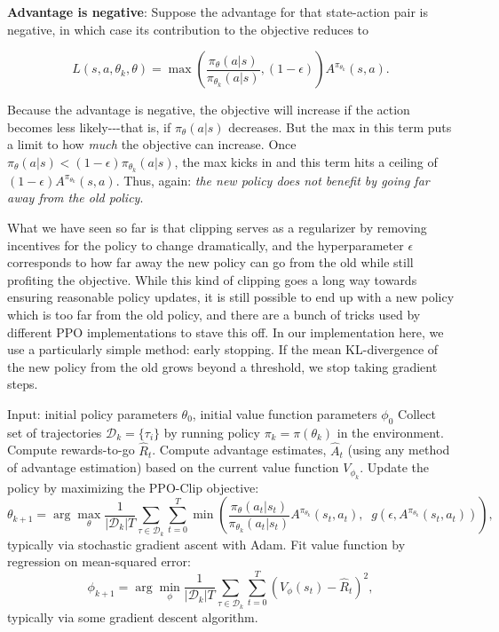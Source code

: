 \documentclass[12pt,a4paper]{article}
\begin{document}
\textbf{Advantage is negative}: Suppose the advantage for that
state-action pair is negative, in which case its contribution to the
objective reduces to

\[L(s,a,\theta_k,\theta) = \max\left(
\frac{\pi_{\theta}(a|s)}{\pi_{\theta_k}(a|s)}, (1 - \epsilon)
\right)  A^{\pi_{\theta_k}}(s,a).\]

Because the advantage is negative, the objective will increase if the
action becomes less likely-\/-\/-that is, if \(\pi_{\theta}(a|s)\)
decreases. But the max in this term puts a limit to how \emph{much} the
objective can increase. Once
\(\pi_{\theta}(a|s) < (1-\epsilon) \pi_{\theta_k}(a|s)\), the max kicks
in and this term hits a ceiling of
\((1-\epsilon) A^{\pi_{\theta_k}}(s,a)\). Thus, again: \emph{the new
policy does not benefit by going far away from the old policy}.

What we have seen so far is that clipping serves as a regularizer by
removing incentives for the policy to change dramatically, and the
hyperparameter \(\epsilon\) corresponds to how far away the new policy
can go from the old while still profiting the objective. While this kind of clipping goes a long way towards ensuring reasonable
policy updates, it is still possible to end up with a new policy which
is too far from the old policy, and there are a bunch of tricks used by
different PPO implementations to stave this off. In our implementation
here, we use a particularly simple method: early stopping. If the mean
KL-divergence of the new policy from the old grows beyond a threshold,
we stop taking gradient steps.

\begin{algorithmic}[1]
    \STATE Input: initial policy parameters $\theta_0$, initial value function parameters $\phi_0$
    \STATE Collect set of trajectories ${\mathcal D}_k = \{\tau_i\}$ by running policy $\pi_k = \pi(\theta_k)$ in the environment.
    \STATE Compute rewards-to-go $\hat{R}_t$.
    \STATE Compute advantage estimates, $\hat{A}_t$ (using any method of advantage estimation) based on the current value function $V_{\phi_k}$.
    \STATE Update the policy by maximizing the PPO-Clip objective:
        \begin{equation*}
        \theta_{k+1} = \arg \max_{\theta} \frac{1}{|{\mathcal D}_k| T} \sum_{\tau \in {\mathcal D}_k} \sum_{t=0}^T \min\left(
            \frac{\pi_{\theta}(a_t|s_t)}{\pi_{\theta_k}(a_t|s_t)}  A^{\pi_{\theta_k}}(s_t,a_t), \;\;
            g(\epsilon, A^{\pi_{\theta_k}}(s_t,a_t))
        \right),
        \end{equation*}
        typically via stochastic gradient ascent with Adam.
    \STATE Fit value function by regression on mean-squared error:
        \begin{equation*}
        \phi_{k+1} = \arg \min_{\phi} \frac{1}{|{\mathcal D}_k| T} \sum_{\tau \in {\mathcal D}_k} \sum_{t=0}^T\left( V_{\phi} (s_t) - \hat{R}_t \right)^2,
        \end{equation*}
        typically via some gradient descent algorithm.
    \ENDFOR
\end{algorithmic}
\end{document}
